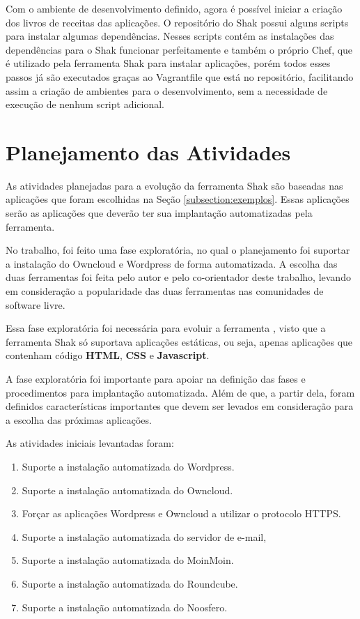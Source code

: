 Com o ambiente de desenvolvimento definido, agora é possível iniciar a criação dos
livros de receitas das aplicações. O repositório do Shak possui alguns scripts
para instalar algumas dependências. Nesses scripts contém as instalações das 
dependências para o Shak funcionar perfeitamente
e também o próprio Chef, que é utilizado pela ferramenta Shak para instalar aplicações, 
porém todos esses passos já são executados graças ao Vagrantfile
que está no repositório, facilitando assim a criação de ambientes para o desenvolvimento,
sem a necessidade de execução de nenhum script adicional.


\section{Planejamento das Atividades}

As atividades planejadas para a evolução da ferramenta Shak são baseadas nas 
aplicações que foram escolhidas na Seção
\ref{subsection:exemplos}. Essas aplicações serão as aplicações que deverão
ter sua implantação automatizadas pela ferramenta. 

No trabalho, foi feito uma fase exploratória, no qual o planejamento foi
suportar a instalação do Owncloud e Wordpress de forma 
automatizada. A escolha das duas ferramentas foi feita pelo autor e pelo co-orientador
deste trabalho, levando em consideração a popularidade das duas ferramentas nas 
comunidades de software livre. 

Essa fase exploratória foi necessária para evoluir a ferramenta
, visto que a ferramenta Shak só suportava aplicações estáticas, ou seja, apenas 
aplicações que contenham 
código \textbf{HTML}, \textbf{CSS} e \textbf{Javascript}. 

A fase exploratória foi importante para apoiar na definição das fases e 
procedimentos para implantação
automatizada. Além de que, a partir dela, foram definidos características importantes 
que devem ser levados em consideração para a escolha das próximas aplicações.

As atividades iniciais levantadas foram:

 \begin{enumerate}
   \item  Suporte a instalação automatizada do Wordpress.
   \item  Suporte a instalação automatizada do Owncloud.
   \item  Forçar as aplicações Wordpress e Owncloud a
   utilizar o protocolo HTTPS.
   \item  Suporte a instalação automatizada do servidor de e-mail,
   \item  Suporte a instalação automatizada do MoinMoin.
   \item  Suporte a instalação automatizada do Roundcube.
   \item  Suporte a instalação automatizada do Noosfero.
 \end{enumerate}

